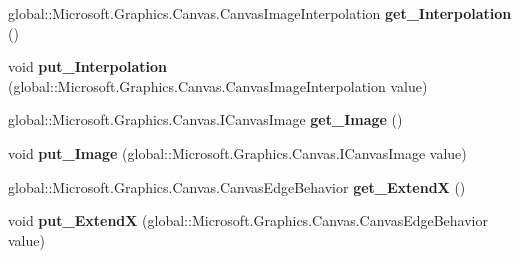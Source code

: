 \begin{DoxyCompactItemize}
\item 
\mbox{\label{interface_microsoft_1_1_graphics_1_1_canvas_1_1_brushes_1_1_i_canvas_image_brush_aebd2633bbc018c5fc49fd70e6a24fed8}} 
global\+::\+Microsoft.\+Graphics.\+Canvas.\+Canvas\+Image\+Interpolation {\bfseries get\+\_\+\+Interpolation} ()
\item 
\mbox{\label{interface_microsoft_1_1_graphics_1_1_canvas_1_1_brushes_1_1_i_canvas_image_brush_a149e4d24e65f75b3f58f3a71d893bcd4}} 
void {\bfseries put\+\_\+\+Interpolation} (global\+::\+Microsoft.\+Graphics.\+Canvas.\+Canvas\+Image\+Interpolation value)
\item 
\mbox{\label{interface_microsoft_1_1_graphics_1_1_canvas_1_1_brushes_1_1_i_canvas_image_brush_a0a2e397b21701c2009442817061aea19}} 
global\+::\+Microsoft.\+Graphics.\+Canvas.\+I\+Canvas\+Image {\bfseries get\+\_\+\+Image} ()
\item 
\mbox{\label{interface_microsoft_1_1_graphics_1_1_canvas_1_1_brushes_1_1_i_canvas_image_brush_adce6e5d6d2750a7392b5352faf3f5f4d}} 
void {\bfseries put\+\_\+\+Image} (global\+::\+Microsoft.\+Graphics.\+Canvas.\+I\+Canvas\+Image value)
\item 
\mbox{\label{interface_microsoft_1_1_graphics_1_1_canvas_1_1_brushes_1_1_i_canvas_image_brush_aa972b7d23b8fc1eb398d518a07940b35}} 
global\+::\+Microsoft.\+Graphics.\+Canvas.\+Canvas\+Edge\+Behavior {\bfseries get\+\_\+\+ExtendX} ()
\item 
\mbox{\label{interface_microsoft_1_1_graphics_1_1_canvas_1_1_brushes_1_1_i_canvas_image_brush_a5355b52f83105ebc903d8a09622319eb}} 
void {\bfseries put\+\_\+\+ExtendX} (global\+::\+Microsoft.\+Graphics.\+Canvas.\+Canvas\+Edge\+Behavior value)
\item 
\mbox{\label{interface_microsoft_1_1_graphics_1_1_canvas_1_1_brushes_1_1_i_canvas_image_brush_aa40db9376b341ac0233a6f2984cff951}} 

\end{DoxyCompactItemize}
